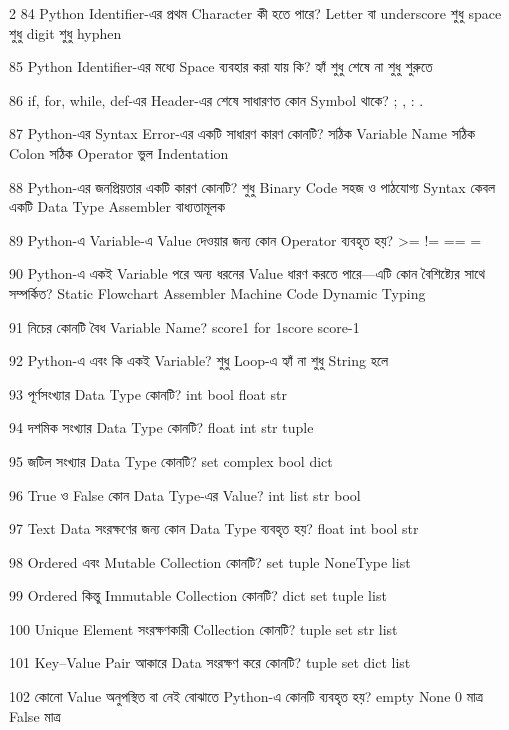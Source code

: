 \begin{multicols}{2}
\mcq
{84}
{Python Identifier-এর প্রথম Character কী হতে পারে?}
{Letter বা underscore}
{শুধু space}
{শুধু digit}
{শুধু hyphen}

\mcq
{85}
{Python Identifier-এর মধ্যে Space ব্যবহার করা যায় কি?}
{হ্যাঁ}
{শুধু শেষে}
{না}
{শুধু শুরুতে}

\mcq
{86}
{if, for, while, def-এর Header-এর শেষে সাধারণত কোন Symbol থাকে?}
{;}
{,}
{:}
{.}

\mcq
{87}
{Python-এর Syntax Error-এর একটি সাধারণ কারণ কোনটি?}
{সঠিক Variable Name}
{সঠিক Colon}
{সঠিক Operator}
{ভুল Indentation}

\mcqwide
{88}
{Python-এর জনপ্রিয়তার একটি কারণ কোনটি?}
{শুধু Binary Code}
{সহজ ও পাঠযোগ্য Syntax}
{কেবল একটি Data Type}
{Assembler বাধ্যতামূলক}

\mcq
{89}
{Python-এ Variable-এ Value দেওয়ার জন্য কোন Operator ব্যবহৃত হয়?}
{>=}
{!=}
{==}
{=}

\mcq
{90}
{Python-এ একই Variable পরে অন্য ধরনের Value ধারণ করতে পারে—এটি কোন বৈশিষ্ট্যের সাথে সম্পর্কিত?}
{Static Flowchart}
{Assembler}
{Machine Code}
{Dynamic Typing}

\mcq
{91}
{নিচের কোনটি বৈধ Variable Name?}
{score1}
{for}
{1score}
{score-1}

\mcq
{92}
{Python-এ  এবং  কি একই Variable?}
{শুধু Loop-এ}
{হ্যাঁ}
{না}
{শুধু String হলে}

\mcq
{93}
{পূর্ণসংখ্যার Data Type কোনটি?}
{int}
{bool}
{float}
{str}

\mcq
{94}
{দশমিক সংখ্যার Data Type কোনটি?}
{float}
{int}
{str}
{tuple}

\mcq
{95}
{জটিল সংখ্যার Data Type কোনটি?}
{set}
{complex}
{bool}
{dict}

\mcq
{96}
{True ও False কোন Data Type-এর Value?}
{int}
{list}
{str}
{bool}

\mcq
{97}
{Text Data সংরক্ষণের জন্য কোন Data Type ব্যবহৃত হয়?}
{float}
{int}
{bool}
{str}

\mcq
{98}
{Ordered এবং Mutable Collection কোনটি?}
{set}
{tuple}
{NoneType}
{list}

\mcq
{99}
{Ordered কিন্তু Immutable Collection কোনটি?}
{dict}
{set}
{tuple}
{list}

\mcq
{100}
{Unique Element সংরক্ষণকারী Collection কোনটি?}
{tuple}
{set}
{str}
{list}

\mcq
{101}
{Key–Value Pair আকারে Data সংরক্ষণ করে কোনটি?}
{tuple}
{set}
{dict}
{list}

\mcq
{102}
{কোনো Value অনুপস্থিত বা নেই বোঝাতে Python-এ কোনটি ব্যবহৃত হয়?}
{empty}
{None}
{0 মাত্র}
{False মাত্র}


\end{multicols}
